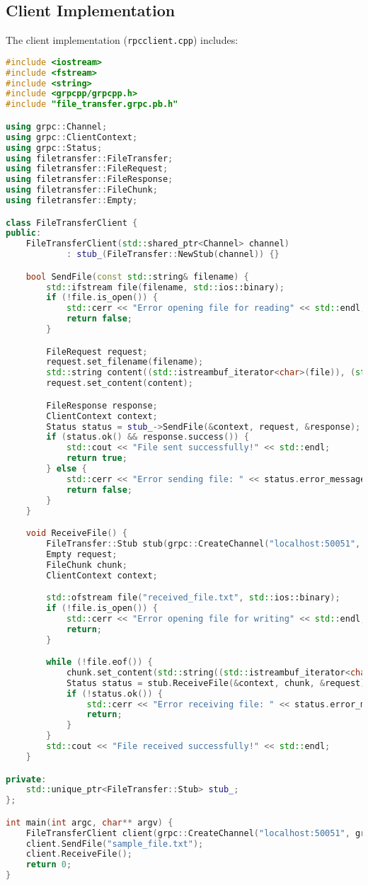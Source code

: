 \documentclass{article}
\begin{document}
\subsection{Client Implementation}
The client implementation (\texttt{rpcclient.cpp}) includes:
\begin{lstlisting}[language=C++, caption=Client Implementation]
#include <iostream>
#include <fstream>
#include <string>
#include <grpcpp/grpcpp.h>
#include "file_transfer.grpc.pb.h"

using grpc::Channel;
using grpc::ClientContext;
using grpc::Status;
using filetransfer::FileTransfer;
using filetransfer::FileRequest;
using filetransfer::FileResponse;
using filetransfer::FileChunk;
using filetransfer::Empty;

class FileTransferClient {
public:
    FileTransferClient(std::shared_ptr<Channel> channel)
            : stub_(FileTransfer::NewStub(channel)) {}

    bool SendFile(const std::string& filename) {
        std::ifstream file(filename, std::ios::binary);
        if (!file.is_open()) {
            std::cerr << "Error opening file for reading" << std::endl;
            return false;
        }

        FileRequest request;
        request.set_filename(filename);
        std::string content((std::istreambuf_iterator<char>(file)), (std::istreambuf_iterator<char>()));
        request.set_content(content);

        FileResponse response;
        ClientContext context;
        Status status = stub_->SendFile(&context, request, &response);
        if (status.ok() && response.success()) {
            std::cout << "File sent successfully!" << std::endl;
            return true;
        } else {
            std::cerr << "Error sending file: " << status.error_message() << std::endl;
            return false;
        }
    }

    void ReceiveFile() {
        FileTransfer::Stub stub(grpc::CreateChannel("localhost:50051", grpc::InsecureChannelCredentials()));
        Empty request;
        FileChunk chunk;
        ClientContext context;

        std::ofstream file("received_file.txt", std::ios::binary);
        if (!file.is_open()) {
            std::cerr << "Error opening file for writing" << std::endl;
            return;
        }

        while (!file.eof()) {
            chunk.set_content(std::string((std::istreambuf_iterator<char>(file)), (std::istreambuf_iterator<char>())));
            Status status = stub.ReceiveFile(&context, chunk, &request);
            if (!status.ok()) {
                std::cerr << "Error receiving file: " << status.error_message() << std::endl;
                return;
            }
        }
        std::cout << "File received successfully!" << std::endl;
    }

private:
    std::unique_ptr<FileTransfer::Stub> stub_;
};

int main(int argc, char** argv) {
    FileTransferClient client(grpc::CreateChannel("localhost:50051", grpc::InsecureChannelCredentials()));
    client.SendFile("sample_file.txt");
    client.ReceiveFile();
    return 0;
}
\end{lstlisting}
\end{document}
